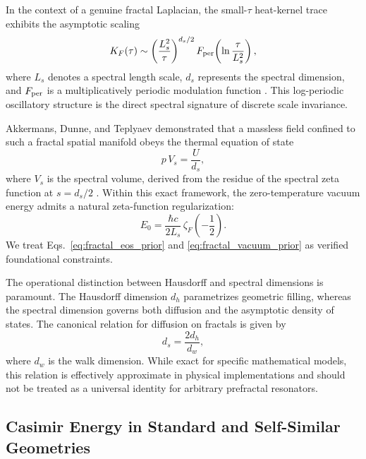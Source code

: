\documentclass[12pt,letterpaper]{article}
\begin{document}
In the context of a genuine fractal Laplacian, the small-$\tau$ heat-kernel trace exhibits the asymptotic scaling
\begin{equation}
K_F(\tau) \sim \left(\frac{L_s^2}{\tau}\right)^{d_s/2} F_{\rm per}\!\left(\ln\frac{\tau}{L_s^2}\right),
\label{eq:fractal_heat_kernel}
\end{equation}
where $L_s$ denotes a spectral length scale, $d_s$ represents the spectral dimension, and $F_{\rm per}$ is a multiplicatively periodic modulation function \cite{akkermans2010,kajino2010}.
This log-periodic oscillatory structure is the direct spectral signature of discrete scale invariance.

Akkermans, Dunne, and Teplyaev demonstrated that a massless field confined to such a fractal spatial manifold obeys the thermal equation of state
\begin{equation}
p\,V_s = \frac{U}{d_s},
\label{eq:fractal_eos_prior}
\end{equation}
where $V_s$ is the spectral volume, derived from the residue of the spectral zeta function at $s=d_s/2$ \cite{akkermans2010}.
Within this exact framework, the zero-temperature vacuum energy admits a natural zeta-function regularization:
\begin{equation}
E_0 = \frac{\hbar c}{2L_s}\,\zeta_F\!\left(-\frac{1}{2}\right).
\label{eq:fractal_vacuum_prior}
\end{equation}
We treat Eqs.~\eqref{eq:fractal_eos_prior} and \eqref{eq:fractal_vacuum_prior} as verified foundational constraints.

The operational distinction between Hausdorff and spectral dimensions is paramount.
The Hausdorff dimension $d_h$ parametrizes geometric filling, whereas the spectral dimension governs both diffusion and the asymptotic density of states.
The canonical relation for diffusion on fractals is given by \cite{alexanderorbach1982}
\begin{equation}
d_s = \frac{2d_h}{d_w},
\label{eq:ds_dw}
\end{equation}
where $d_w$ is the walk dimension.
While exact for specific mathematical models, this relation is effectively approximate in physical implementations and should not be treated as a universal identity for arbitrary prefractal resonators.

\subsection{Casimir Energy in Standard and Self-Similar Geometries}
\end{document}
